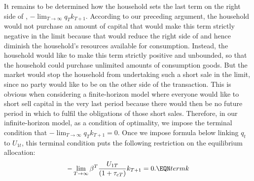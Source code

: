 It remains to be determined how the household sets the last term
on the right side of , $- \lim_{T \rightarrow \infty}
 q_T k_{T+1}$. According to our preceding argument,
the household would not purchase an amount of capital  that would
make this term  strictly negative in the limit because that would
reduce the right side of  and hence diminish the
household's resources available for consumption. Instead, the
household would like to make this term strictly positive and
unbounded, so that the household could purchase unlimited amounts
of consumption goods. But the market would stop the household from
undertaking such a short sale in the limit, since no party would
like to be on the other side of the transaction. This is obvious
when considering a finite-horizon model where everyone would like
to short sell capital in the very last period because there would
then be no future period in which to fulfil the obligations of
those short sales. Therefore, in our infinite-horizon model, as a
condition of optimality, we  impose the
  terminal condition  that
  $- \lim_{T \rightarrow \infty}  q_T k_{T+1} =0 $.
Once we impose formula  below linking $q_t$ to $U_{1t}$,
this terminal condition puts the following restriction on the
equilibrium allocation:
$$
  - \lim_{T \rightarrow \infty}  \beta^T {U_{1T}
\over (1+\tau_{cT})} k_{T+1} =0. \EQN termk $$




